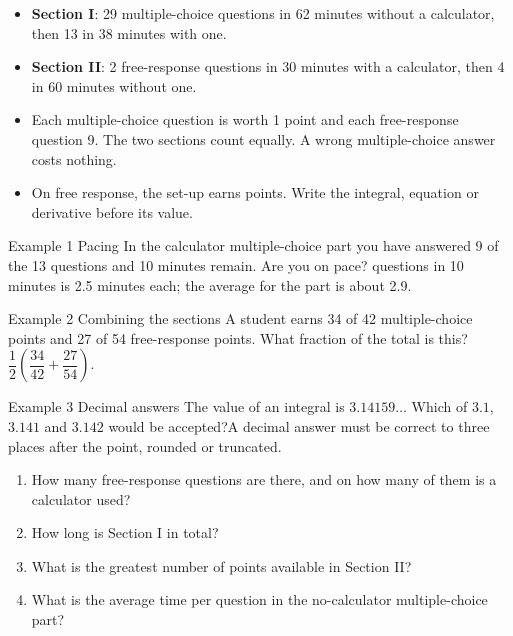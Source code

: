 \documentclass[11pt]{article}
\begin{document}

\begin{ideabox}
\begin{itemize}[leftmargin=*,itemsep=2pt,topsep=2pt]
  \item \textbf{Section I}: 29 multiple-choice questions in 62 minutes without a calculator, then 13 in 38 minutes with one.
  \item \textbf{Section II}: 2 free-response questions in 30 minutes with a calculator, then 4 in 60 minutes without one.
  \item Each multiple-choice question is worth 1 point and each free-response question 9. The two sections count equally. A wrong multiple-choice answer costs nothing.
  \item On free response, the set-up earns points. Write the integral, equation or derivative before its value.
\end{itemize}
\end{ideabox}

\begin{example}{Example 1 \textperiodcentered{} Pacing}
In the calculator multiple-choice part you have answered 9 of the 13 questions and 10 minutes remain. Are you on pace? questions in 10 minutes is 2.5 minutes each; the average for the part is about 2.9.
\end{example}

\begin{example}{Example 2 \textperiodcentered{} Combining the sections}
A student earns 34 of 42 multiple-choice points and 27 of 54 free-response points. What fraction of the total is this?\soln $\dfrac12\left(\dfrac{34}{42}+\dfrac{27}{54}\right)$.
\end{example}

\begin{example}{Example 3 \textperiodcentered{} Decimal answers}
The value of an integral is $3.14159\ldots$ Which of $3.1$, $3.141$ and $3.142$ would be accepted?\soln A decimal answer must be correct to three places after the point, rounded or truncated.
\end{example}

\newpage
{}

\begin{enumerate}[leftmargin=*,itemsep=2pt]
  \item How many free-response questions are there, and on how many of them is a calculator used?\work{2.3cm}
  \item How long is Section I in total?\work{2.3cm}
  \item What is the greatest number of points available in Section II?\work{2.3cm}
  \item What is the average time per question in the no-calculator multiple-choice part?\work{2.3cm}
\end{enumerate}
\end{document}
